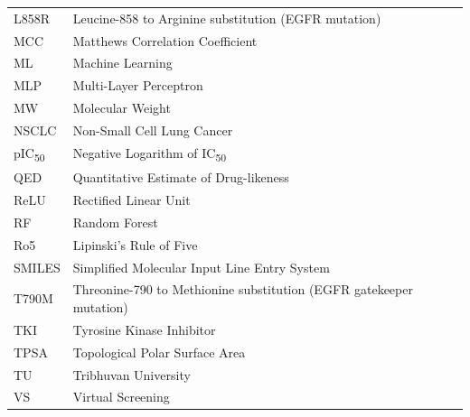 \begin{longtable}{@{}p{3.5cm}p{10cm}@{}}
L858R     & Leucine-858 to Arginine substitution
            (EGFR mutation) \\
MCC       & Matthews Correlation Coefficient \\
ML        & Machine Learning \\
MLP       & Multi-Layer Perceptron \\
MW        & Molecular Weight \\
NSCLC     & Non-Small Cell Lung Cancer \\
pIC\textsubscript{50}
          & Negative Logarithm of
            IC\textsubscript{50} \\
QED       & Quantitative Estimate of Drug-likeness \\
ReLU      & Rectified Linear Unit \\
RF        & Random Forest \\
Ro5       & Lipinski's Rule of Five \\
SMILES    & Simplified Molecular Input Line Entry
            System \\
T790M     & Threonine-790 to Methionine substitution
            (EGFR gatekeeper mutation) \\
TKI       & Tyrosine Kinase Inhibitor \\
TPSA      & Topological Polar Surface Area \\
TU        & Tribhuvan University \\
VS        & Virtual Screening \\

\end{longtable}
